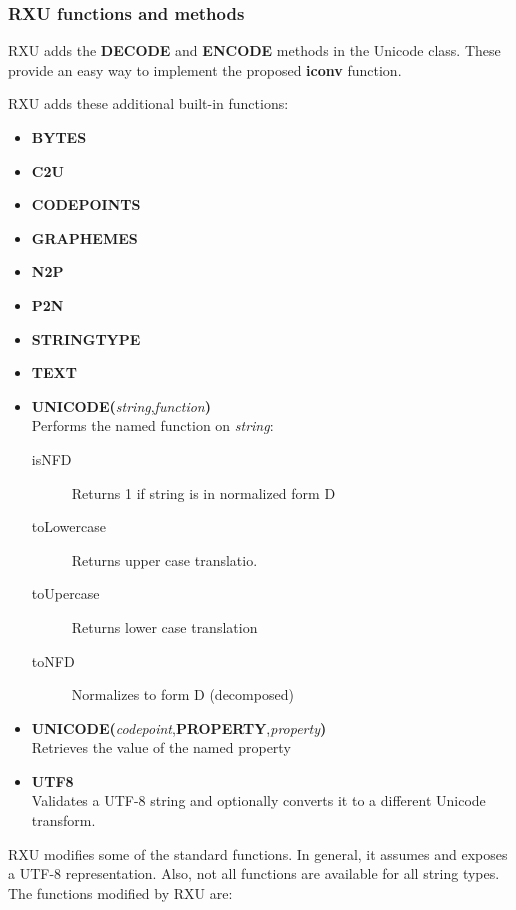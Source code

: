 \documentclass[b4paper]{article}
\begin{document}
\subsubsection{RXU functions and methods}

RXU adds the \textbf{DECODE} and \textbf{ENCODE} methods in the Unicode class. These provide an easy way to implement the proposed \textbf{iconv} function.

RXU adds these\cite{RXU:NewBIFs} additional built-in functions:

\begin{itemize}
\item \textbf{BYTES}
\item \textbf{C2U}
\item \textbf{CODEPOINTS}
\item \textbf{GRAPHEMES}
\item \textbf{N2P}
\item \textbf{P2N}
\item \textbf{STRINGTYPE}
\item \textbf{TEXT}
\item \textbf{UNICODE(}\textit{string},\textit{function}\textbf{)} \\
Performs the named function on \textit{string}:
\begin{description}
\item[isNFD] Returns 1 if string is in normalized form D
\item[toLowercase]
Returns upper case translatio.
\item[toUpercase]
Returns lower case translation
\item[toNFD] Normalizes to form D (decomposed)
\end{description}
\item \textbf{UNICODE(}\textit{codepoint},\textbf{PROPERTY},\textit{property}\textbf{)} \\
Retrieves the value of the named property
\item \textbf{UTF8} \\
Validates a UTF-8 string and optionally converts it to a different Unicode transform.
\end{itemize}

RXU modifies some of the standard functions. In general, it assumes and exposes a UTF-8 representation. Also, not all functions are available for all string types. The functions modified by RXU are:
\end{document}
